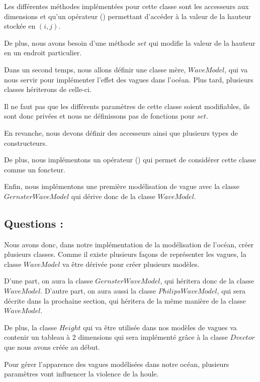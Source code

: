 \documentclass{article}
\begin{document}
Les différentes méthodes implémentées pour cette classe sont les accesseurs aux dimensions et qu'un opérateur () permettant d'accéder à la valeur de la hauteur stockée en $(i,j)$.

De plus, nous avons besoin d'une méthode $set$ qui modifie la valeur de la hauteur en un endroit particulier.

Dans un second temps,  nous allons définir une classe mère, $WaveModel$, qui va nous servir pour implémenter l'effet des vagues dans l'océan. Plus tard, plusieurs classes hériterons de celle-ci.

Il ne faut pas que les différents paramètres de cette classe soient modifiables, ils sont donc privées et nous ne définissons pas de fonctions pour $set$.

En revanche, nous devons définir des accesseurs ainsi que plusieurs types de constructeurs.

De plus, nous implémentons un opérateur () qui permet de considérer cette classe comme un foncteur.

Enfin, nous implémentons une première modélisation de vague avec la classe $GernsterWaveModel$ qui dérive donc de la classe $WaveModel$.

\vspace{0.5cm}

\subsection{Questions :}

Nous avons donc, dans notre implémentation de la modélisation de l'océan, créer plusieurs classes. Comme il existe plusieurs façons de représenter les vagues, la classe $WaveModel$ va être dérivée pour créer plusieurs modèles.

D'une part, on aura la classe $GernsterWaveModel$, qui héritera donc de la classe $WaveModel$. D'autre part, on aura aussi la classe $PhilipsWaveModel$, qui sera décrite dans la prochaine section, qui héritera de la même manière de la classe $WaveModel$.

De plus, la classe $Height$ qui va être utilisée dans nos modèles de vagues va contenir un tableau à 2 dimensions qui sera implémenté grâce à la classe $Dvector$ que nous avons créée au début.

\vspace{1cm}


Pour gérer l'apparence des vagues modélisées dans notre océan, plusieurs paramètres vont influencer la violence de la houle.
\end{document}
